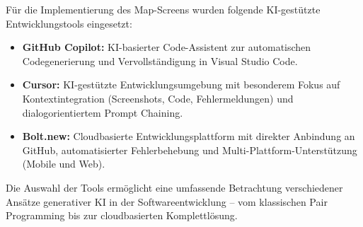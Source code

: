 Für die Implementierung des Map-Screens wurden folgende KI-gestützte
Entwicklungstools eingesetzt:

\begin{itemize}
      \item \textbf{GitHub Copilot:} KI-basierter Code-Assistent zur automatischen Codegenerierung und Vervollständigung in Visual Studio Code.
      \item \textbf{Cursor:} KI-gestützte Entwicklungsumgebung mit besonderem Fokus auf Kontextintegration (Screenshots, Code, Fehlermeldungen) und dialogorientiertem Prompt Chaining.
      \item \textbf{Bolt.new:} Cloudbasierte Entwicklungsplattform mit direkter Anbindung an GitHub, automatisierter Fehlerbehebung und Multi-Plattform-Unterstützung (Mobile und Web).
\end{itemize}

Die Auswahl der Tools ermöglicht eine umfassende Betrachtung verschiedener
Ansätze generativer KI in der Softwareentwicklung – vom klassischen Pair
Programming bis zur cloudbasierten Komplettlösung.

